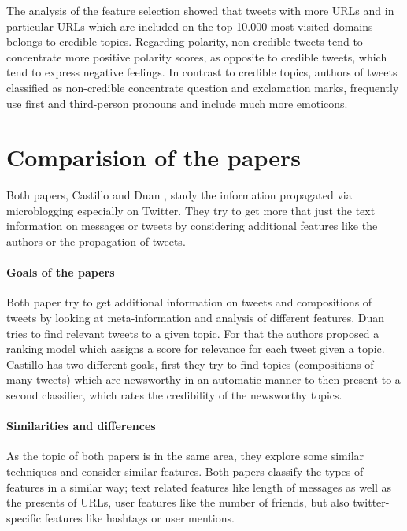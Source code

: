\documentclass{proseminar}
\let\i\undefined
\newcommand{\i}[1]{\emph{#1}}
\begin{document}
The analysis of the feature selection showed that tweets with more URLs and in particular URLs which are included on the top-10.000 most visited domains belongs to credible topics. 
Regarding polarity, non-credible tweets tend to concentrate more positive polarity scores, as opposite to credible tweets, which tend to express negative feelings.
In contrast to credible topics, authors of tweets classified as non-credible concentrate question and exclamation marks, frequently use first and third-person pronouns and include much more emoticons.



\section{Comparision of the papers}
Both papers, Castillo \i{et al.} and Duan \i{et al.}, study the information propagated via microblogging especially on Twitter. They try to get more that just the text information on messages or tweets by considering additional features like the authors or the propagation of tweets.

\paragraph{Goals of the papers}
Both paper try to get additional information on tweets and compositions of tweets by looking at meta-information and analysis of different features.
Duan \i{et al.} tries to find relevant tweets to a given topic. For that the authors proposed a ranking model which assigns a score for relevance for each tweet given a topic.
Castillo \i{et al.} has two different goals, first they try to find topics (compositions of many tweets) which are newsworthy in an automatic manner to then present to a second classifier, which rates the credibility of the newsworthy topics.

\paragraph{Similarities and differences}
As the topic of both papers is in the same area, they explore some similar techniques and consider similar features. Both papers classify the types of features in a similar way; text related features like length of messages as well as the presents of URLs, user features like the number of friends, but also twitter-specific features like hashtags or user mentions.
\end{document}
